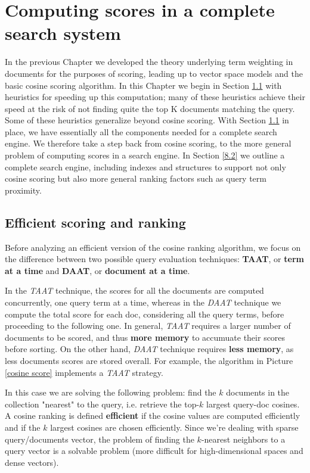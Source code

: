 \section{Computing scores in a complete search system}
In the previous Chapter we developed the theory underlying term weighting in documents for the purposes of scoring, leading up to vector space models and the basic cosine scoring algorithm. In this Chapter we begin in Section \ref{8.1} with heuristics for speeding up this computation; many of these heuristics achieve their speed at the risk of not finding quite the top K documents matching the query. Some of these heuristics generalize beyond cosine scoring. With Section \ref{8.1} in place, we have essentially all the components needed for a complete search engine. We therefore take a step back from cosine scoring, to the more general problem of computing scores in a search engine. In Section \ref{8.2} we outline a complete search engine, including indexes and structures to support not only cosine scoring but also more general ranking factors such as query term proximity. 

\subsection{Efficient scoring and ranking}\label{8.1}
Before analyzing an efficient version of the cosine ranking algorithm, we focus on the difference between two possible query evaluation techniques: \textbf{TAAT}, or \textbf{term at a time} and \textbf{DAAT}, or \textbf{document at a time}. 

In the \textit{TAAT} technique, the scores for all the documents are computed concurrently, one query term at a time, whereas in the \textit{DAAT} technique we compute the total score for each doc, considering all the query terms, before proceeding to the following one. In general, \textit{TAAT} requires a larger number of documents to be scored, and thus \textbf{more memory} to accumuate their scores before sorting. On the other hand, \textit{DAAT} technique requires \textbf{less memory}, as less documents scores are stored overall. For example, the algorithm in Picture \ref{cosine score} implements a \textit{TAAT} strategy.

In this case we are solving the following problem: find the $k$ documents in the collection "nearest" to the query, i.e. retrieve the top-$k$ largest query-doc cosines. A cosine ranking is defined \textbf{efficient} if the cosine values are computed efficiently and if the $k$ largest cosines are chosen efficiently. Since we're dealing with sparse query/documents vector, the problem of finding the $k$-nearest neighbors to a query vector is a solvable problem (more difficult for high-dimensional spaces and dense vectors).

